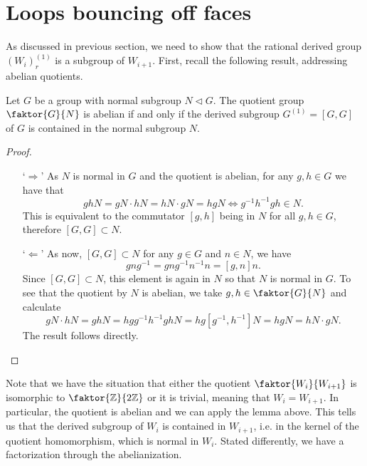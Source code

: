 \section{Loops bouncing off faces}

As discussed in previous section, we need to show that the rational derived group \((W_i)_r^{(1)}\) is a subgroup of \(W_{i+1}\).
First, recall the following result, addressing abelian quotients.

\begin{lemma}
    Let \(G\) be a group with normal subgroup \(N \triangleleft G\).
    The quotient group \(\faktor{G}{N}\) is abelian if and only if the derived subgroup \(G^{(1)} = [G, G]\) of \(G\) is contained in the normal subgroup \(N\).
\end{lemma}
\begin{proof}
    \begin{itemize}
        \item[`\(\Rightarrow\)'] As \(N\) is normal in \(G\) and the quotient is abelian, for any \(g,h \in G\) we have that
            \[ghN = gN \cdot hN = hN \cdot gN = hgN \iff g^{-1}h^{-1}gh \in N.\]
            This is equivalent to the commutator \([g, h]\) being in \(N\) for all \(g,h \in G\), therefore \([G, G] \subset N\).
        
        \item[`\(\Leftarrow\)'] As now, \([G, G] \subset N\) for any \(g \in G\) and \(n \in N\), we have
            \[gng^{-1} = gng^{-1}n^{-1}n = [g, n]n.\]
            Since \([G, G] \subset N\), this element is again in \(N\) so that \(N\) is normal in \(G\).
            To see that the quotient by \(N\) is abelian, we take \(g, h \in \faktor{G}{N}\) and calculate
            \[gN \cdot hN = ghN = hgg^{-1}h^{-1}ghN = hg[g^{-1}, h^{-1}]N = hgN = hN \cdot gN.\]
            The result follows directly.
    \end{itemize}\vspace*{-2\parskip}
\end{proof}

\noindent
Note that we have the situation that either the quotient \(\faktor{W_i}{W_{i+1}}\) is isomorphic to \(\faktor{\Z}{2\Z}\) or it is trivial, meaning that \(W_{i} = W_{i+1}\).
In particular, the quotient is abelian and we can apply the lemma above.
This tells us that the derived subgroup of \(W_i\) is contained in \(W_{i+1}\), i.e. in the kernel of the quotient homomorphism, which is normal in \(W_i\).
Stated differently, we have a factorization through the abelianization.

